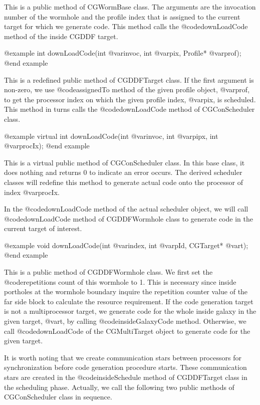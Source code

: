 {This is a public method of CGWormBase class. The arguments are the
invocation number of the wormhole and the profile index that is assigned
to the current target for which we generate code.
This method calls the @code{downLoadCode} method of the inside CGDDF target.

@example
int downLoadCode(int @var{invoc}, int @var{pix},  Profile* @var{prof});
@end example

This is a redefined public method of CGDDFTarget class.
If the first argument is non-zero, we use @code{assignedTo} method of the
given profile object, @var{prof}, to get the processor index on 
which the given profile index, @var{pix}, is scheduled. This method in turns
calls the @code{downLoadCode} method of CGConScheduler class.

@example
virtual int downLoadCode(int @var{invoc}, int @var{pipx}, int @var{procIx});
@end example

This is a virtual public method of CGConScheduler class. In this base class,
it does nothing and returns 0 to indicate an error occurs. The derived
scheduler classes will redefine this method to generate actual code onto
the processor of index @var{procIx}.

In the @code{downLoadCode} method of the actual scheduler object, we will
call @code{downLoadCode} method of CGDDFWormhole class to generate code
in the current target of interest.

@example
void downLoadCode(int @var{index}, int @var{pId}, CGTarget* @var{t});
@end example

This is a public method of CGDDFWormhole class. We first set the
@code{repetitions} count of this wormhole to 1. This is necessary
since inside portholes at the wormhole boundary inquire the repetition
counter value of the far side block to calculate the resource requirement.
If the code generation target is not a multiprocessor target, 
we generate code for the
whole inside galaxy in the given target, @var{t}, by calling
@code{insideGalaxyCode} method. Otherwise, we call @code{downLoadCode}
of the CGMultiTarget object to generate code for the given target.

It is worth noting that we create communication stars between processors
for synchronization before code generation procedure starts. These
communication stars are created in the @code{insideSchedule} method
of CGDDFTarget class in the scheduling phase. Actually, we call
the following two public methods of CGConScheduler class in sequence.

}
